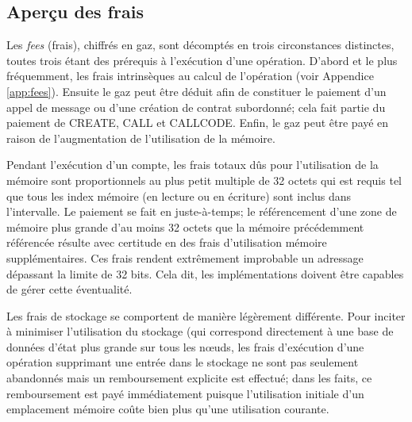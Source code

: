 \documentclass[9pt,oneside]{amsart}
\begin{document}
\begin{multicols}{2}
\subsection{Aperçu des frais}

Les \textit{fees} (frais), chiffrés en gaz, sont décomptés en trois circonstances distinctes, toutes trois étant des prérequis à l'exécution d'une opération. D'abord et le plus fréquemment, les frais intrinsèques au calcul de l'opération (voir Appendice \ref{app:fees}). Ensuite le gaz peut être déduit afin de constituer le paiement d'un appel de message ou d'une création de contrat subordonné; cela fait partie du paiement de {\small CREATE}, {\small CALL} et {\small CALLCODE}. Enfin, le gaz peut être payé en raison de l'augmentation de l'utilisation de la mémoire.

Pendant l'exécution d'un compte,
les frais totaux dûs pour l'utilisation de la mémoire sont proportionnels au plus petit multiple de 32 octets qui est requis tel que tous les index mémoire (en lecture ou en écriture) sont inclus dans l'intervalle. Le paiement se fait en juste-à-temps; le référencement d'une zone de mémoire plus grande d'au moins 32 octets que la mémoire précédemment référencée résulte avec certitude en des frais d'utilisation mémoire supplémentaires. Ces frais rendent extrêmement improbable un adressage dépassant la limite de 32 bits. Cela dit, les implémentations doivent être capables de gérer cette éventualité.

Les frais de stockage se comportent de manière légèrement différente. Pour inciter à minimiser l'utilisation du stockage (qui correspond directement à une base de données d'état plus grande sur tous les n\oe{}uds, les frais d'exécution d'une opération supprimant une entrée dans le stockage ne sont pas seulement abandonnés mais un remboursement explicite est effectué; dans les faits, ce remboursement est payé immédiatement puisque l'utilisation initiale d'un emplacement mémoire coûte bien plus qu'une utilisation courante.


\end{multicols}
\end{document}
